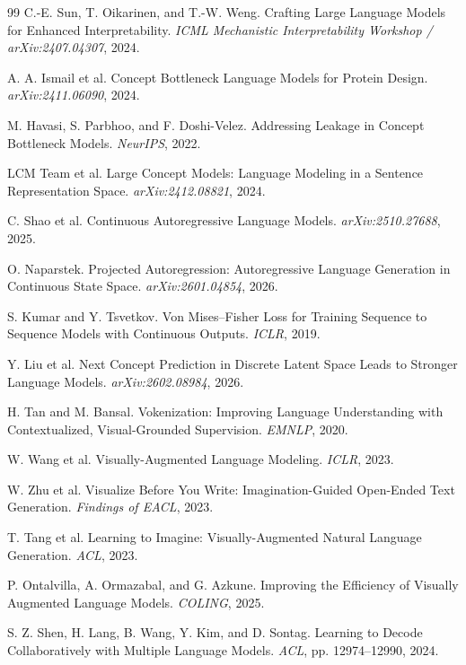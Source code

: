 \documentclass[11pt,a4paper]{article}
\begin{document}
\begin{thebibliography}{99}
 C.-E. Sun, T. Oikarinen, and T.-W. Weng. Crafting Large Language Models for Enhanced Interpretability. \emph{ICML Mechanistic Interpretability Workshop / arXiv:2407.04307}, 2024.

 A. A. Ismail et al. Concept Bottleneck Language Models for Protein Design. \emph{arXiv:2411.06090}, 2024.

 M. Havasi, S. Parbhoo, and F. Doshi-Velez. Addressing Leakage in Concept Bottleneck Models. \emph{NeurIPS}, 2022.

 LCM Team et al. Large Concept Models: Language Modeling in a Sentence Representation Space. \emph{arXiv:2412.08821}, 2024.

 C. Shao et al. Continuous Autoregressive Language Models. \emph{arXiv:2510.27688}, 2025.

 O. Naparstek. Projected Autoregression: Autoregressive Language Generation in Continuous State Space. \emph{arXiv:2601.04854}, 2026.

 S. Kumar and Y. Tsvetkov. Von Mises--Fisher Loss for Training Sequence to Sequence Models with Continuous Outputs. \emph{ICLR}, 2019.

 Y. Liu et al. Next Concept Prediction in Discrete Latent Space Leads to Stronger Language Models. \emph{arXiv:2602.08984}, 2026.

 H. Tan and M. Bansal. Vokenization: Improving Language Understanding with Contextualized, Visual-Grounded Supervision. \emph{EMNLP}, 2020.

 W. Wang et al. Visually-Augmented Language Modeling. \emph{ICLR}, 2023.

 W. Zhu et al. Visualize Before You Write: Imagination-Guided Open-Ended Text Generation. \emph{Findings of EACL}, 2023.

 T. Tang et al. Learning to Imagine: Visually-Augmented Natural Language Generation. \emph{ACL}, 2023.

 P. Ontalvilla, A. Ormazabal, and G. Azkune. Improving the Efficiency of Visually Augmented Language Models. \emph{COLING}, 2025.

 S. Z. Shen, H. Lang, B. Wang, Y. Kim, and D. Sontag. Learning to Decode Collaboratively with Multiple Language Models. \emph{ACL}, pp. 12974--12990, 2024.


\end{thebibliography}
\end{document}
